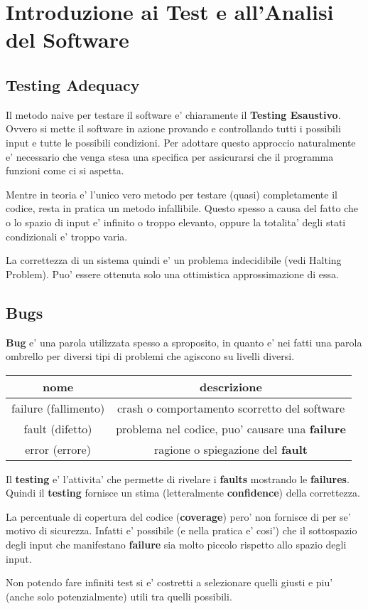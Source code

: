 \chapter{Introduzione ai Test e all'Analisi del Software}

\section{Testing Adequacy}

Il metodo naive per testare il software e' chiaramente il \textbf{Testing Esaustivo}.
Ovvero si mette il software in azione provando e controllando tutti i possibili input e tutte le possibili condizioni. 
Per adottare questo approccio naturalmente e' necessario che venga stesa una specifica per assicurarsi che il programma funzioni come ci si aspetta.

Mentre in teoria e' l'unico vero metodo per testare (quasi) completamente il codice, resta in pratica un metodo infallibile.
Questo spesso a causa del fatto che o lo spazio di input e' infinito o troppo elevanto, oppure la totalita' degli stati condizionali e' troppo varia.

La correttezza di un sistema quindi e' un problema indecidibile (vedi Halting Problem). Puo' essere ottenuta solo una ottimistica approssimazione di essa.

\section{Bugs}

\textbf{Bug} e' una parola utilizzata spesso a sproposito, in quanto e' nei fatti una parola ombrello per diversi tipi di problemi che agiscono su livelli diversi.

\begin{center}
    \begin{tabular}{|| c c ||}
        \hline
        nome & descrizione \\
        \hline
        failure (fallimento) & crash o comportamento scorretto del software \\
	fault (difetto) & problema nel codice, puo' causare una \textbf{failure} \\
	error (errore) & ragione o spiegazione del \textbf{fault} \\
        \hline
    \end{tabular}
\end{center}

Il \textbf{testing} e' l'attivita' che permette di rivelare i \textbf{faults} mostrando le \textbf{failures}.
Quindi il \textbf{testing} fornisce un stima (letteralmente \textbf{confidence}) della correttezza.

La percentuale di copertura del codice (\textbf{coverage}) pero' non fornisce di per se' motivo di sicurezza.
Infatti e' possibile (e nella pratica e' cosi') che il sottospazio degli input che manifestano \textbf{failure} sia molto piccolo rispetto allo spazio degli input.

Non potendo fare infiniti test si e' costretti a selezionare quelli giusti e piu' (anche solo potenzialmente) utili tra quelli possibili.
